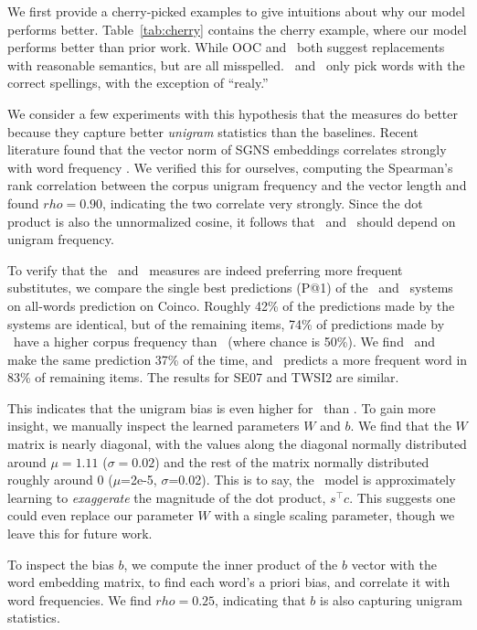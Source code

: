 \documentclass[letterpaper]{article}
\begin{document}
We first provide a cherry-picked examples to give intuitions about why
our model performs better. Table~\ref{tab:cherry} contains the cherry example,
where our model performs better than prior work. While OOC
and \balAddCos~both suggest replacements with reasonable semantics, but are
all misspelled. \ourmeas~and \ourmeasparam~only pick words with the correct spellings,
with the exception of ``realy.''

We consider a few experiments with this hypothesis that the measures do better
because they capture better {\em unigram} statistics than the baselines. Recent literature found that the vector
norm of SGNS embeddings correlates strongly with word frequency
\cite{wilson:arxiv15}. We verified this for ourselves, computing the Spearman's
rank correlation between the corpus unigram frequency and the vector length
and found $rho = 0.90$, indicating the two correlate very strongly. Since the
dot product is also the unnormalized cosine, it follows that \ourmeas~and
\ourmeasparam~should depend on unigram frequency.

To verify that the \ourmeas~and \ourmeasparam~measures are indeed preferring more frequent
substitutes, we compare the single best predictions (P@1) of the \balAddCos~and
\ourmeas~systems on all-words prediction on Coinco. Roughly 42\% of the predictions made
by the systems are identical, but of the remaining items, 74\% of
predictions made by \ourmeas~have a higher corpus frequency than \balAddCos~(where
chance is 50\%). We find \balAddCos~and \ourmeasparam~
make the same prediction 37\% of the time, and \ourmeasparam~predicts a
more frequent word in 83\% of remaining items. The results for SE07 and
TWSI2 are similar.

This indicates that the unigram bias is even higher for \ourmeasparam~than
\ourmeas. To gain more insight, we manually inspect the learned parameters $W$
and $b$. We find that the $W$ matrix is nearly diagonal, with the values along
the diagonal normally distributed around $\mu=1.11$ ($\sigma=0.02$) and the rest
of the matrix normally distributed roughly around 0 ($\mu$=2e-5, $\sigma$=0.02). This
is to say, the \ourmeasparam~model is approximately learning to {\em exaggerate} the
magnitude of the dot product, $s^\top c$. This suggests one could even replace our
parameter $W$ with a single scaling parameter, though we leave this
for future work.

To inspect the bias $b$, we compute the inner product of the $b$ vector with
the word embedding matrix, to find each word's a priori bias, and correlate it with word frequencies. We find
$rho=0.25$, indicating that $b$ is also capturing unigram
statistics.
\end{document}
